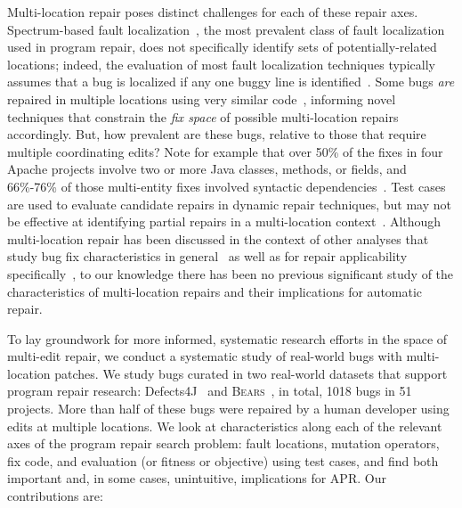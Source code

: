 \documentclass[10pt,journal,compsoc]{IEEEtran}
\newcommand\bears{\textsc{Bears}\xspace}
\begin{document}
Multi-location repair poses distinct challenges for each of these repair axes.
Spectrum-based fault localization~\cite{ochiai}, the most prevalent class of
fault localization used in program repair, does not specifically
identify sets of potentially-related locations; indeed,
the evaluation of most fault localization techniques typically assumes that a bug
is localized if any one buggy line is identified~\cite{fl-survey-wong}.
Some bugs \emph{are}
repaired in multiple locations using very similar
code~\cite{saha2019harnessing,jiang2019cmsuggester}, informing novel techniques
that constrain the \emph{fix space} of possible multi-location repairs accordingly.
But, how prevalent are these bugs, 
relative to those that require multiple
coordinating edits?
Note for example that over 50\% of the fixes in four 
Apache projects involve two or more  Java classes, methods, or fields, and  66\%-76\% of 
those multi-entity fixes involved syntactic dependencies~\cite{wang2018}. 
Test cases are used to evaluate candidate repairs in dynamic
repair techniques, but may not be effective
at identifying partial repairs in a multi-location
context~\cite{better-fitness}.  
Although multi-location repair has been discussed in the context of other analyses
that study bug fix characteristics in general~\cite{d4j-dissection} as well as for
repair applicability specifically~\cite{zhong2015, wang2018}, 
to our
knowledge there has been no previous significant study of the characteristics of
multi-location repairs and their implications for automatic
repair.

To lay groundwork for more informed, systematic research
efforts in the space of multi-edit repair, we conduct a systematic study of real-world bugs with
multi-location patches.  We study bugs curated in two
real-world datasets that support program repair research: Defects4J~\cite{defects4j}
and \bears~\cite{bears}, in total, 1018 bugs in 51 projects.
More than half of these bugs were repaired by a
human developer using edits at multiple locations.  We look at characteristics along each of the
relevant axes of the program repair search problem: fault locations, mutation
operators, fix code, and evaluation (or fitness or objective) using test cases,
and find both important and, in some cases, unintuitive, implications for
APR.  Our contributions are:
\end{document}

